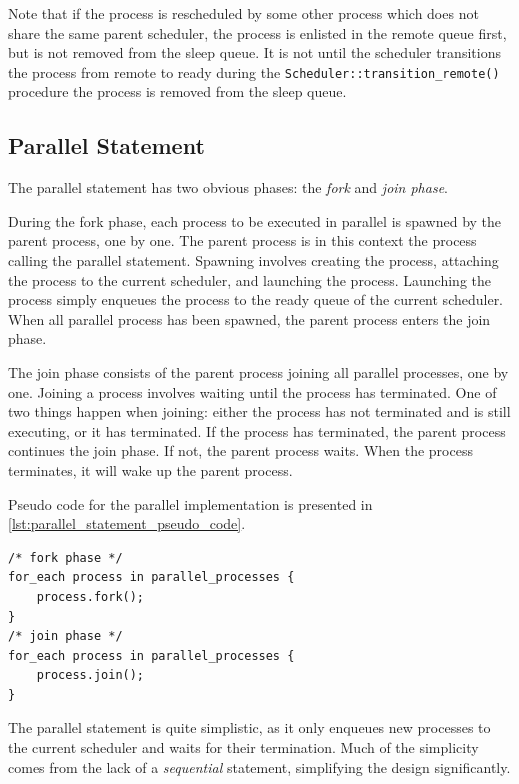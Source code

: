 Note that if the process is rescheduled by some other process which does not share the same parent scheduler, the process is enlisted in the remote queue first, but is not removed from the sleep queue. It is not until the scheduler transitions the process from remote to ready during the \texttt{Scheduler::transition\_remote()} procedure the process is removed from the sleep queue.


\subsection{Parallel Statement}


The parallel statement has two obvious phases: the \textit{fork} and \textit{join phase}. 

During the fork phase, each process to be executed in parallel is spawned by the parent process, one by one. The parent process is in this context the process calling the parallel statement. Spawning involves creating the process, attaching the process to the current scheduler, and launching the process. Launching the process simply enqueues the process to the ready queue of the current scheduler. When all parallel process has been spawned, the parent process enters the join phase.

The join phase consists of the parent process joining all parallel processes, one by one. Joining a process involves waiting until the process has terminated. One of two things happen when joining: either the process has not terminated and is still executing, or it has terminated. If the process has terminated, the parent process continues the join phase. If not, the parent process waits. When the process terminates, it will wake up the parent process.

Pseudo code for the parallel implementation is presented in \cref{lst:parallel_statement_pseudo_code}.

\begin{lstfloat}
\begin{lstlisting}[caption={Parallel statement pseudo code.}, label={lst:parallel_statement_pseudo_code}, style={CustomC++}, xleftmargin={2em}]
/* fork phase */
for_each process in parallel_processes {
    process.fork();
}
/* join phase */
for_each process in parallel_processes {
    process.join();
}
\end{lstlisting}
\end{lstfloat}

The parallel statement is quite simplistic, as it only enqueues new processes to the current scheduler and waits for their termination. Much of the simplicity comes from the lack of a \textit{sequential} statement, simplifying the design significantly. 


